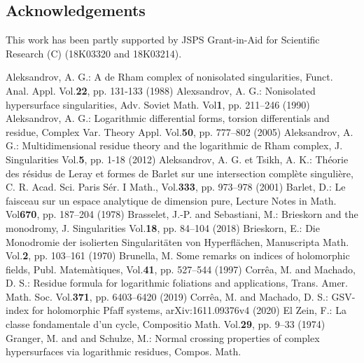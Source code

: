 \documentclass{arxsigma}
\begin{document}
\subsection*{Acknowledgements}
This work has been partly supported by JSPS Grant-in-Aid for
Scientific Research (C) (18K03320 and 18K03214).
\begin{thebibliography}{99}
\footnotesize\itemsep=0pt
\providecommand{\eprint}{\href{http://arxiv.org/abs/#2}{arXiv:#2}}
Aleksandrov, A. G.:
\newblock A de Rham complex of nonisolated singularities,
\newblock Funct. Anal. Appl.
Vol.{\bf 22}, pp. 131-133 (1988)
Alexsandrov, A. G.:
\newblock Nonisolated hypersurface singularities,
\newblock Adv. Soviet Math.
Vol{\bf 1}, pp. 211--246 (1990)
Aleksandrov, A. G.:
\newblock Logarithmic differential forms, torsion differentials and residue,
\newblock Complex Var. Theory Appl.
Vol.{\bf 50}, pp. 777--802 (2005)
Aleksandrov, A. G.:
\newblock Multidimensional residue theory and the logarithmic de Rham complex,
\newblock J. Singularities
Vol.{\bf 5}, pp. 1-18 (2012)
Aleksandrov, A. G. et Tsikh, A. K.:
\newblock Th\'eorie des r\'esidus de Leray et formes de Barlet sur une intersection compl\`ete singuli\`ere,
\newblock C. R. Acad. Sci. Paris S\'er. I Math.,
Vol.{\bf 333}, pp. 973--978 (2001)
Barlet, D.:
\newblock Le faisceau   sur un espace analytique   de dimension pure,
\newblock Lecture Notes in Math.
Vol{\bf 670}, pp. 187--204 (1978)
Brasselet, J.-P. and Sebastiani, M.:
\newblock Brieskorn and the monodromy,
\newblock J. Singularities
Vol.{\bf 18}, pp. 84--104 (2018)
Brieskorn, E.:
\newblock Die Monodromie der isolierten Singularit\"aten von Hyperfl\"achen,
\newblock Manuscripta Math.
Vol.{\bf 2}, pp. 103--161 (1970)
Brunella, M.
\newblock Some remarks on indices of holomorphic fields,
\newblock Publ. Matem\`atiques,
Vol.{\bf 41}, pp. 527--544 (1997)
Corr\^ea, M.
and Machado, D. S.:
\newblock Residue formula for logarithmic foliations and applications,
\newblock Trans. Amer. Math. Soc.
Vol.{\bf 371}, pp. 6403--6420 (2019)
Corr\^ea, M.
and Machado, D. S.:
\newblock GSV-index for holomorphic Pfaff systems,
\newblock arXiv:1611.09376v4 (2020)
El Zein, F.:
\newblock La classe fondamentale d'un cycle,
\newblock Compositio Math.
Vol.{\bf 29}, pp. 9--33 (1974)
Granger, M. and
and Schulze, M.:
\newblock
Normal crossing properties of complex hypersurfaces via logarithmic residues,
\newblock Compos. Math.

\end{thebibliography}
\end{document}
